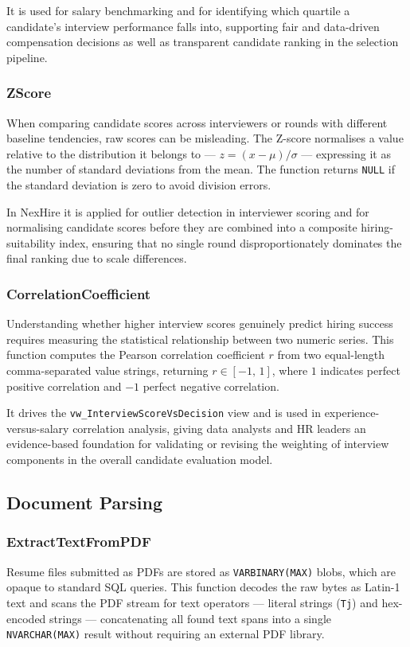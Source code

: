 \documentclass[11pt,a4paper]{article}
\begin{document}
It is used for salary benchmarking and for identifying which quartile a candidate's interview performance falls into, supporting fair and data-driven compensation decisions as well as transparent candidate ranking in the selection pipeline.

\subsubsection{ZScore}
\noindent
When comparing candidate scores across interviewers or rounds with different baseline tendencies, raw scores can be misleading. The Z-score normalises a value relative to the distribution it belongs to --- $z = (x - \mu) / \sigma$ --- expressing it as the number of standard deviations from the mean. The function returns \texttt{NULL} if the standard deviation is zero to avoid division errors.

In NexHire it is applied for outlier detection in interviewer scoring and for normalising candidate scores before they are combined into a composite hiring-suitability index, ensuring that no single round disproportionately dominates the final ranking due to scale differences.

\subsubsection{CorrelationCoefficient}
\noindent
Understanding whether higher interview scores genuinely predict hiring success requires measuring the statistical relationship between two numeric series. This function computes the Pearson correlation coefficient $r$ from two equal-length comma-separated value strings, returning $r \in [-1,\,1]$, where $1$ indicates perfect positive correlation and $-1$ perfect negative correlation.

It drives the \texttt{vw\_InterviewScoreVsDecision} view and is used in experience-versus-salary correlation analysis, giving data analysts and HR leaders an evidence-based foundation for validating or revising the weighting of interview components in the overall candidate evaluation model.

\subsection{Document Parsing}

\subsubsection{ExtractTextFromPDF}
\noindent
Resume files submitted as PDFs are stored as \texttt{VARBINARY(MAX)} blobs, which are opaque to standard SQL queries. This function decodes the raw bytes as Latin-1 text and scans the PDF stream for text operators --- literal strings (\texttt{Tj}) and hex-encoded strings --- concatenating all found text spans into a single \texttt{NVARCHAR(MAX)} result without requiring an external PDF library.
\end{document}
